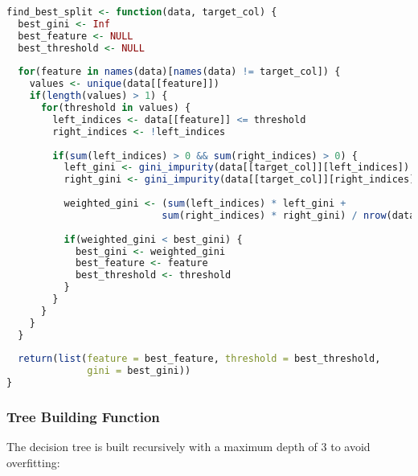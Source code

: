 \begin{lstlisting}[language=R, caption=Best Split Finding Function]
find_best_split <- function(data, target_col) {
  best_gini <- Inf
  best_feature <- NULL
  best_threshold <- NULL
  
  for(feature in names(data)[names(data) != target_col]) {
    values <- unique(data[[feature]])
    if(length(values) > 1) {
      for(threshold in values) {
        left_indices <- data[[feature]] <= threshold
        right_indices <- !left_indices
        
        if(sum(left_indices) > 0 && sum(right_indices) > 0) {
          left_gini <- gini_impurity(data[[target_col]][left_indices])
          right_gini <- gini_impurity(data[[target_col]][right_indices])
          
          weighted_gini <- (sum(left_indices) * left_gini + 
                           sum(right_indices) * right_gini) / nrow(data)
          
          if(weighted_gini < best_gini) {
            best_gini <- weighted_gini
            best_feature <- feature
            best_threshold <- threshold
          }
        }
      }
    }
  }
  
  return(list(feature = best_feature, threshold = best_threshold, 
              gini = best_gini))
}
\end{lstlisting}

\subsubsection{Tree Building Function}

The decision tree is built recursively with a maximum depth of 3 to avoid overfitting:

